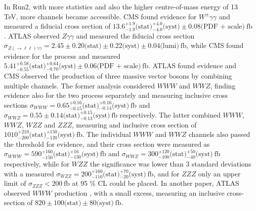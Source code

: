 In Run2, with more statistics and also the higher centre-of-mass energy of 13 TeV, more channels became accessible.
CMS found evidence for $W^\pm\gamma\gamma$ \cite{SMP-19-013} and measured a fiducial cross section of
$13.6^{+1.9}_{-1.9} \text{(stat)} {}^{+4.0}_{-4.0} \text{(syst)} \pm 0.08 \text{(PDF + scale)}~\text{fb}$.
ATLAS observed $Z\gamma\gamma$ \cite{STDM-2021-09} and measured the fiducial cross section $\sigma_{Z(\rightarrow \ell\ell)\gamma\gamma} = 2.45 \pm 0.20 \text{(stat)} \pm 0.22 \text{(syst)} \pm 0.04 \text{(lumi)}~\text{fb}$,
while CMS found evidence for the process \cite{SMP-19-013} and measured $5.41^{+0.58}_{-0.55} \text{(stat)} {}^{+0.64}_{-0.70} \text{(syst)} \pm 0.06 \text{(PDF + scale)}~\text{fb}$.
ATLAS found evidence \cite{STDM-2017-22} and CMS observed \cite{SMP-19-014} the production of three massive vector bosons by combining multiple channels.
The former analysis considered $WWW$ and $WWZ$, finding evidence also for the two process separately and measuring inclusive cross sections
$\sigma_{WWW} = 0.65^{+0.16}_{-0.15} \text{(stat)} {}^{+0.16}_{-0.14} \text{(syst)}~\text{fb}$ and
$\sigma_{WWZ} = 0.55 \pm 0.14 \text{(stat)} {}^{+0.15}_{-0.13} \text{(syst)}~\text{fb}$ respectively.
The latter combined $WWW$, $WWZ$, $WZZ$ and $ZZZ$, measuring and inclusive cross section of $1010^{+210}_{-200}\text{(stat)}{}^{+150}_{-120}\text{(syst)}~\text{fb}$.
The individual $WWW$ and $WWZ$ channels also passed the threshold for evidence, and their cross section were measured as
$\sigma_{WWW} = 590 ^{+160}_{-150} \text{(stat)} {}^{+16}_{-130} \text{(syst)}~\text{fb}$ and
$\sigma_{WWZ} = 300 ^{+120}_{-100} \text{(stat)} {}^{+50}_{-40 } \text{(syst)}~\text{fb}$ respectively,
while for $WZZ$ the significance was lower than 3 standard deviations with a measured
$\sigma_{WZZ} = 200 ^{+160}_{-110} \text{(stat)} {}^{+70}_{-20 } \text{(syst)}~\text{fb}$,
and for $ZZZ$ only an upper limit of $\sigma_{ZZZ} < 200~\text{fb}$ at 95 \% CL could be placed.
In another paper, ATLAS observed $WWW$ production \cite{HDBS-2019-16}, with a small excess, measuring an inclusive cross-section of $820 \pm 100 \text{(stat)} \pm 80 \text{(syst)}~\text{fb}$.
